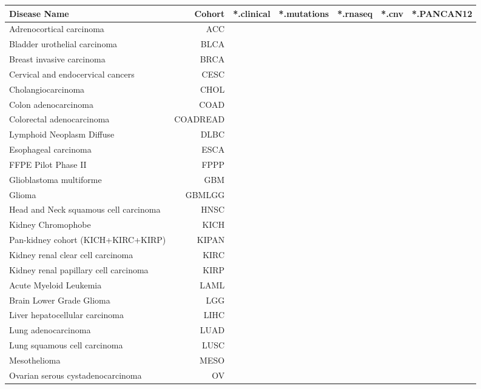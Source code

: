 \begin{table}[h!]

\begin{tabular}{lrrrrrr}
\toprule
Disease Name & Cohort & *.clinical & *.mutations & *.rnaseq & *.cnv & *.PANCAN12 \\
\toprule
Adrenocortical carcinoma &  ACC & \ & \ & \ & \ & \ \\
Bladder urothelial carcinoma &  BLCA& \ & \ & \ & \ & \ \\
Breast invasive carcinoma & BRCA    & \ & \ & \ & \ & \ \\
Cervical and endocervical cancers & CESC    & \ & \ & \ & \ & \ \\
Cholangiocarcinoma &    CHOL    & \ & \ & \ & \ & \ \\
Colon adenocarcinoma     & COAD & \ & \ & \ & \ & \ \\
Colorectal adenocarcinoma & COADREAD    & \ & \ & \ & \ & \ \\
Lymphoid Neoplasm Diffuse & DLBC    & \ & \ & \ & \ & \ \\
Esophageal carcinoma &  ESCA    & \ & \ & \ & \ & \ \\
FFPE Pilot Phase II  & FPPP & \ & \ & \ & \ & \ \\
Glioblastoma multiforme & GBM & \ & \ & \ & \ & \   \\
Glioma &    GBMLGG  & \ & \ & \ & \ & \ \\
Head and Neck squamous cell carcinoma & HNSC& \ & \ & \ & \ & \ \\
Kidney Chromophobe &    KICH    & \ & \ & \ & \ & \ \\
Pan-kidney cohort (KICH+KIRC+KIRP) &    KIPAN   & \ & \ & \ & \ & \ \\
Kidney renal clear cell carcinoma & KIRC    & \ & \ & \ & \ & \ \\
Kidney renal papillary cell carcinoma & KIRP & \ & \ & \ & \ & \    \\
Acute Myeloid Leukemia &    LAML    & \ & \ & \ & \ & \ \\
Brain Lower Grade Glioma &  LGG & \ & \ & \ & \ & \ \\
Liver hepatocellular carcinoma &    LIHC & \ & \ & \ & \ & \    \\
Lung adenocarcinoma &   LUAD    & \ & \ & \ & \ & \ \\
Lung squamous cell carcinoma &  LUSC & \ & \ & \ & \ & \    \\
Mesothelioma &  MESO    & \ & \ & \ & \ & \ \\
Ovarian serous cystadenocarcinoma & OV & \ & \ & \ & \ & \  \\

\end{tabular}
\end{table}
